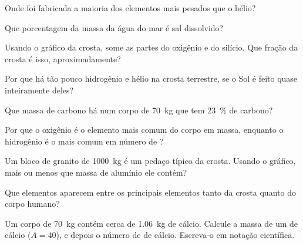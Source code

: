 \begin{exercise}[$\star$]\label{exo:g9:elements-universe-earth:3}
Onde foi fabricada a maioria dos elementos mais pesados que o hélio?
\end{exercise}

\begin{exercise}[$\star$]\label{exo:g9:elements-universe-earth:4}
Que porcentagem da massa da água do mar é sal dissolvido?
\end{exercise}

\begin{exercise}[$\star\star$]\label{exo:g9:elements-universe-earth:5}
Usando o gráfico da crosta, some as partes do oxigênio e do silício. Que
fração da crosta é isso, aproximadamente?
\end{exercise}

\begin{exercise}[$\star\star$]\label{exo:g9:elements-universe-earth:6}
Por que há tão pouco hidrogênio e hélio na crosta terrestre, se o Sol é
feito quase inteiramente deles?
\end{exercise}

\begin{exercise}[$\star\star$]\label{exo:g9:elements-universe-earth:7}
Que massa de carbono há num corpo de \qty{70}{kg} que tem
\qty{23}{\percent} de carbono?
\end{exercise}

\begin{exercise}[$\star\star$]\label{exo:g9:elements-universe-earth:8}
Por que o oxigênio é o elemento mais comum do corpo em massa, enquanto o
hidrogênio é o mais comum em número de ?
\end{exercise}

\begin{exercise}[$\star\star$]\label{exo:g9:elements-universe-earth:9}
Um bloco de granito de \qty{1000}{kg} é um pedaço típico da crosta.
Usando o gráfico, mais ou menos que massa de alumínio ele contém?
\end{exercise}

\begin{exercise}[$\star\star$]\label{exo:g9:elements-universe-earth:10}
Que elementos aparecem entre os principais elementos tanto da crosta
quanto do corpo humano?
\end{exercise}

\begin{exercise}[$\star\star\star$]\label{exo:g9:elements-universe-earth:11}
Um corpo de \qty{70}{kg} contém cerca de \qty{1.06}{kg} de cálcio.
Calcule a massa de um  de cálcio ($A = 40$), e depois o número de
 de cálcio. Escreva-o em notação científica.
\end{exercise}

